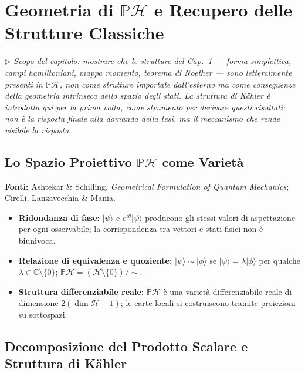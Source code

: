 \documentclass[12pt, a4paper]{article}
\newcommand{\fonti}[1]{%
	\begin{fontebox}
		\textcolor{fontecolor}{\footnotesize\textbf{Fonti:} #1}
	\end{fontebox}%
}
\newcommand{\nota}[1]{%
	\par\smallskip
	\noindent\textit{\small $\triangleright$\; #1}
	\par\smallskip
}
\begin{document}
	\section{Geometria di $\mathbb{P}\mathcal{H}$ e Recupero delle Strutture Classiche}
	
	\nota{Scopo del capitolo: mostrare che le strutture del Cap.\ 1 --- forma simplettica,
		campi hamiltoniani, mappa momento, teorema di Noether --- sono letteralmente presenti
		in $\mathbb{P}\mathcal{H}$, non come strutture importate dall'esterno ma come
		conseguenze della geometria intrinseca dello spazio degli stati. La struttura di
		Kähler è introdotta qui per la prima volta, come strumento per derivare questi
		risultati; non è la risposta finale alla domanda della tesi, ma il meccanismo che
		rende visibile la risposta.}
	
	\subsection{Lo Spazio Proiettivo $\mathbb{P}\mathcal{H}$ come Varietà}
	
	\fonti{Ashtekar \& Schilling, \textit{Geometrical Formulation of Quantum Mechanics};
		Cirelli, Lanzavecchia \& Mania.}
	
	\begin{itemize}
		\item \textbf{Ridondanza di fase:} $|\psi\rangle$ e $e^{i\theta}|\psi\rangle$
		producono gli stessi valori di aspettazione per ogni osservabile; la corrispondenza
		tra vettori e stati fisici non è biunivoca.
		\item \textbf{Relazione di equivalenza e quoziente:} $|\psi\rangle \sim |\phi\rangle$
		se $|\psi\rangle = \lambda|\phi\rangle$ per qualche $\lambda \in \mathbb{C}\setminus\{0\}$;
		$\mathbb{P}\mathcal{H} = (\mathcal{H}\setminus\{0\})/{\sim}$.
		\item \textbf{Struttura differenziabile reale:} $\mathbb{P}\mathcal{H}$ è una varietà
		differenziabile reale di dimensione $2(\dim\mathcal{H}-1)$; le carte locali si
		costruiscono tramite proiezioni su sottospazi.
	\end{itemize}
	
	\subsection{Decomposizione del Prodotto Scalare e Struttura di Kähler}
	
\end{document}
